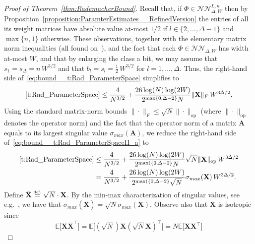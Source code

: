\documentclass{article}
\numberwithin{equation}{section}
\theoremstyle{definition}
\newcommand{\eqdef}{\ensuremath{\stackrel{\mbox{\upshape\tiny def.}}{=}}}
\begin{document}
\begin{proof}[{Proof of Theorem~\ref{thm:RademacherBound}}]
Recall that, if $\Phi\in \mathcal{NN}_{\Delta,W}^{L,n}$ then by Proposition~\ref{proposition:ParamterEstimates__RefinedVersion} the entries of all its weight matrices have absolute value at-most $1/2$ if $l\in \{2,\dots,\Delta-1\}$ and $\max\{n,1\}$ otherwise.  These observations, together with the elementary matrix norm inequalities (all found on~\citep[page 56]{GolubVanLoan_MatrixComputationsBook_1989}), and the fact that each $\Phi\in\mathcal{NN}_{\Delta,W}$ has width at-most $W$, and that by enlarging the class a bit, we may assume that 
$s_1=s_{\Delta}=n\,W^{3/2}$ and that $b_l=s_l=\frac{1}{2}\,W^{3/2}$ for $l=1,\dots,\Delta$.  Thus, the right-hand side of~\eqref{eq:bound__t:Rad_ParameterSpace} simplifies to
\begin{equation}
\label{eq:bound__t:Rad_ParameterSpaceII_a}
    \eqref{t:Rad_ParameterSpace} 
\le 
    \frac{4}{N^{3/2}}
    +
    \frac{26\log(N)\log(2W)}{
        2^{\max\{0,\Delta-2\}}
    N
    }
    \|\mathbf{X}\|_F
    \,W^{3\Delta/2}
.
\end{equation} 
Using the standard matrix-norm bounds $\|\cdot\|_F\le \sqrt{N}\|\cdot\|_{\operatorname{op}}$ (where $\|\cdot\|_{\operatorname{op}}$ denotes the operator norm) and the fact that the operator norm of a matrix $\mathbf{A}$ equals to its largest singular value $\sigma_{max}(\mathbf{A})$, we reduce the right-hand side of~\eqref{eq:bound__t:Rad_ParameterSpaceII_a} to
\begin{equation}
\label{eq:bound__t:Rad_ParameterSpaceII_b}
\begin{aligned}
    \eqref{t:Rad_ParameterSpace} 
& \le 
    \frac{4}{N^{3/2}}
    +
    \frac{26\log(N)\log(2W)}{
        2^{\max(\{0,\Delta-2\}}
    N
    }
    \sqrt{N}\|\mathbf{X}\|_{\operatorname{op}}
    \,W^{3\Delta/2}
\\
& =
    \frac{4}{N^{3/2}}
    +
    \frac{26\log(N)\log(2W)}{
        2^{\max(\{0,\Delta-2\}}
        \sqrt{N}
    }
    \sigma_{max}(\mathbf{X})
    \,W^{3\Delta/2}
.
\end{aligned}
\end{equation} 
Define $\bar{\mathbf{X}}\eqdef \sqrt{N}\cdot \mathbf{X}$.
By the min-max characterization of singular values, see e.g.~\citep[Theorem 4.2.11]{HornJohnstone_2013_matrixanalysisBook}, we have that $\sigma_{max}(\bar{\mathbf{X}})
=
\sqrt{N}\sigma_{max}(\mathbf{X})
$.  Observe also that $\bar{\mathbf{X}}$ is isotropic since
\[
\mathbb{E}\big[\bar{\mathbf{X}}\bar{\mathbf{X}}^{\top}\big] 
= 
\mathbb{E}\big[(\sqrt{N})\mathbf{X}(\sqrt{N}\mathbf{X})^{\top}\big] 
=
N
\mathbb{E}\big[\mathbf{X}\mathbf{X}^{\top}]
\]
\end{proof}
\end{document}
